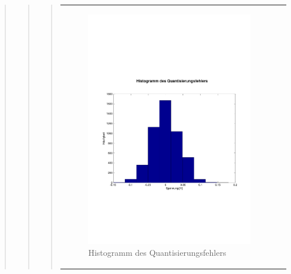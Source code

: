 \begin{quote}
\begin{quote}
\begin{quote}
\begin{center}
\begin{tabular}{ll}
                    \begin{minipage}{0.6\textwidth}
                        \begin{figure}[H]
                            \includegraphics[scale=0.4, trim = 0cm 7cm 0cm
                            7.5cm, clip]
                            {./Bilder/drei100_Histogramm}
                              \caption{Histogramm des Quantisierungsfehlers}
                        \end{figure}
                    \end{minipage}
                
                \end{tabular}
            \end{center}
            \vspace{1em}
            
        

\end{quote}
\end{quote}
\end{quote}

